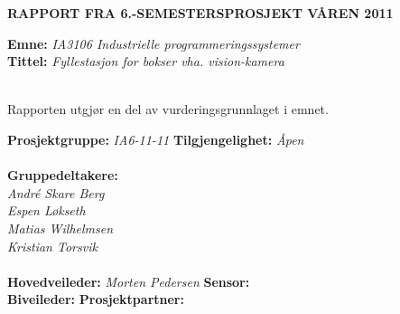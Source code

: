 \documentclass [12pt,norsk]{article}
\newcommand{\RapportFra}{\textbf{\MakeUppercase{Rapport fra 6.-semestersprosjekt våren 2011}}}
\newcommand{\Gruppe}{IA6-11-11}
\newcommand{\Emne}{Industrielle programmeringssystemer}
\newcommand{\Emnekode}{IA3106}
\newcommand{\Tittel}{Fyllestasjon for bokser vha. vision-kamera}
\newcommand{\Hovedveileder}{Morten Pedersen}
\newcommand{\Biveileder}{}
\newcommand{\Sensor}{}
\newcommand{\Prosjektpartner}{}
\begin{document}
\newpage


\label{Sammendrag}

\RapportFra  \\
\begin{tabbing}
    \textbf{Emne: }   \= \textit{\Emnekode { } \Emne }\\
    \textbf{Tittel: } \> \textit{\Tittel}
\end{tabbing}
\noindent\\
Rapporten utgjør en del av vurderingsgrunnlaget i emnet.
\noindent\\
\begin{tabbing}
    \noindent \textbf{Prosjektgruppe: }     \=
    \textit{\Gruppe }\hspace{35mm}          \=
    \textbf{Tilgjengelighet: }\hspace{3mm}  \=
    \textit{Åpen}              \\
    \noindent                  \\
    \textbf{Gruppedeltakere:}  \\
    \textit{André Skare Berg}  \\
    \textit{Espen Løkseth}     \\
    \textit{Matias Wilhelmsen} \\
    \textit{Kristian Torsvik}  \\
    \noindent                  \\
    \textbf{Hovedveileder:}    \> \textit{\Hovedveileder} \> \textbf{Sensor:}          \> \textit{\Sensor} \\
    \textbf{Biveileder: }      \> \textit{\Biveileder}    \> \textbf{Prosjektpartner:} \> \textit{\Prosjektpartner}
\end{tabbing}
\end{document}
